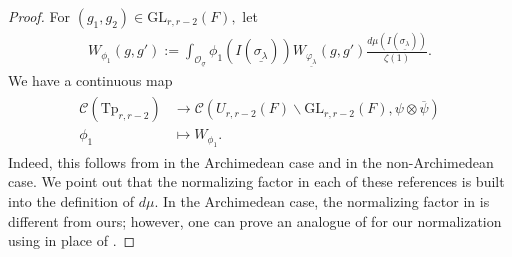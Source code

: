 \documentclass[12pt]{amsart}
\theoremstyle{remark}
\numberwithin{equation}{section}
\newcommand{\GL}{\mathrm{GL}}
\newcommand{\lto}{\longrightarrow}
\newcommand{\OO}{\mathcal{O}}
\theoremstyle{definition}
\numberwithin{equation}{subsection}
\begin{document}
\begin{proof}
For $(g_1,g_2)\in\GL_{r,r-2}(F),$ let
\begin{align*}
W_{\phi_1}(g,g'):=\int_{\OO_{\underline{\sigma}}}\phi_1(I(\underline{\sigma_{\lambda}}))W_{\underline{\varphi_\lambda}}\left(g,g'  \right)\frac{d\mu(I(\underline{\sigma_{\lambda}}))}{\zeta(1)}.
\end{align*}
We have a continuous map
\begin{align} \label{Whitt:cont} \begin{split}
\mathcal{C}(\mathrm{Tp}_{r,r-2}) &\lto \mathcal{C}(U_{r,r-2}(F) \backslash \GL_{r,r-2}(F),\psi \otimes \overline{\psi})\\
\phi_1 &\longmapsto W_{\phi_1}. \end{split}
\end{align}
Indeed, this follows from \cite[Theorem 14.3]{vandenBan:MS} in the Archimedean case and  \cite[Proposition 6.1]{Delorme:Whitt} in the non-Archimedean case. We point out that the normalizing factor in each of these references is built into the definition of $d\mu.$ In the Archimedean case, the normalizing factor in \cite{vandenBan:MS} is different from ours; however, one can prove an analogue of \cite[Theorem 14.3]{vandenBan:MS} for our normalization using \cite[Lemma 13.2]{vandenBan:MS} in place of \cite[Lemma 13.5 and Corollary 13.7]{vandenBan:MS}.




\end{proof}
\end{document}
